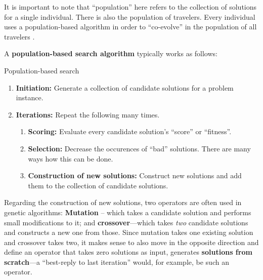 It is important to note that ``population'' here refers to the
collection of solutions for a single individual.  There is also the
population of travelers.  Every individual uses a population-based
algorithm in order to ``co-evolve'' in the population of all
travelers \citep[also see][]{Balmer_PhDThesis_2007}.

A \textbf{population-based search algorithm} typically works as
follows:
\begin{algorithm}[H]

\caption{Population-based search}

\begin{enumerate}

\item \textbf{Initiation:} Generate a collection of candidate
  solutions for a problem instance.

\item \textbf{Iterations:} Repeat the following many times.

\begin{enumerate}

\item \textbf{Scoring:} Evaluate every candidate solution's ``score''
  or ``fitness''.

\item \textbf{Selection:} Decrease the occurences of ``bad''
  solutions.  There are many ways how this can be done.

\item \textbf{Construction of new solutions:} Construct new solutions
  and add them to the collection of candidate solutions.

\end{enumerate}

\end{enumerate}

\end{algorithm}

Regarding the construction of new solutions, two operators are often
used in genetic algorithms: \textbf{Mutation} -- which takes a
candidate solution and performs small modifications to it; and
\textbf{crossover}---which takes \emph{two} candidate solutions and
constructs a new one from those.  Since mutation takes one existing
solution and crossover takes two, it makes sense to also move in the
opposite direction and define an operator that takes zero solutions as
input, \ie generates \textbf{solutions from scratch}---a
``best-reply to last iteration'' would, for example, be such an
operator.

